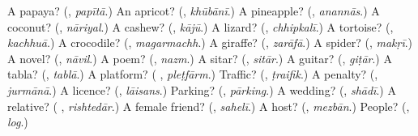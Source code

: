 \begin{tcolorbox}[breakable,colback=teal!4,colframe=teal!35!black,title={Before you move on}]
A papaya? (\textbf{}, \emph{papītā}.) An apricot? (\textbf{}, \emph{khūbānī}.) A pineapple? (\textbf{}, \emph{anannās}.) A coconut? (\textbf{}, \emph{nāriyal}.) A cashew? (\textbf{}, \emph{kājū}.) A lizard? (\textbf{}, \emph{chhipkalī}.) A tortoise? (\textbf{}, \emph{kachhuā}.) A crocodile? (\textbf{}, \emph{magarmachh}.) A giraffe? (\textbf{}, \emph{zarāfā}.) A spider? (\textbf{}, \emph{makṛī}.) A novel? (\textbf{}, \emph{nāvil}.) A poem? (\textbf{}, \emph{nazm}.) A sitar? (\textbf{}, \emph{sitār}.) A guitar? (\textbf{}, \emph{giṭār}.) A tabla? (\textbf{}, \emph{tablā}.) A platform? (\textbf{ }, \emph{pleṭfārm}.) Traffic? (\textbf{}, \emph{ṭraifik}.) A penalty? (\textbf{}, \emph{jurmānā}.) A licence? (\textbf{}, \emph{lāisans}.) Parking? (\textbf{}, \emph{pārking}.) A wedding? (\textbf{}, \emph{shādī}.) A relative? (\textbf{ }, \emph{rishtedār}.) A female friend? (\textbf{}, \emph{sahelī}.) A host? (\textbf{}, \emph{mezbān}.) People? (\textbf{}, \emph{log}.)
\end{tcolorbox}
